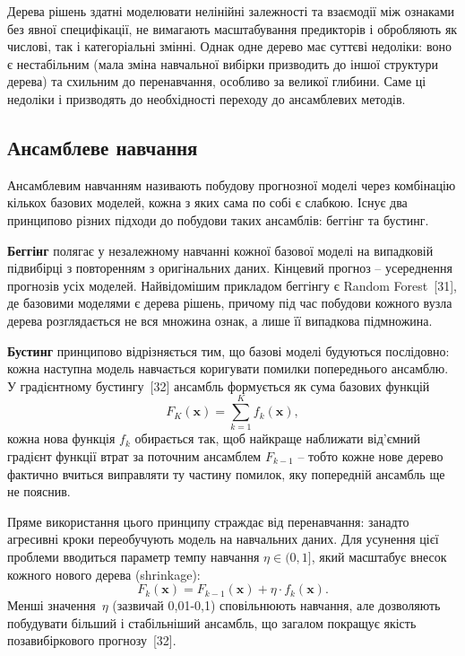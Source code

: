 \documentclass{bachelor_thesis}
\begin{document}
Дерева рішень здатні моделювати нелінійні залежності та взаємодії між ознаками без явної специфікації, не вимагають масштабування предикторів і обробляють як числові, так і категоріальні змінні. Однак одне дерево має суттєві недоліки: воно є нестабільним (мала зміна навчальної вибірки призводить до іншої структури дерева) та схильним до перенавчання, особливо за великої глибини. Саме ці недоліки і призводять до необхідності переходу до ансамблевих методів.

\subsection{Ансамблеве навчання}

Ансамблевим навчанням називають побудову прогнозної моделі через комбінацію кількох базових моделей, кожна з яких сама по собі є слабкою. Існує два принципово різних підходи до побудови таких ансамблів: беггінг та бустинг.

\textbf{Беггінг} полягає у незалежному навчанні кожної базової моделі на випадковій підвибірці з повторенням з оригінальних даних. Кінцевий прогноз -- усереднення прогнозів усіх моделей. Найвідомішим прикладом беггінгу є Random Forest~[31], де базовими моделями є дерева рішень, причому під час побудови кожного вузла дерева розглядається не вся множина ознак, а лише її випадкова підмножина.

\textbf{Бустинг} принципово відрізняється тим, що базові моделі будуються послідовно: кожна наступна модель навчається коригувати помилки попереднього ансамблю. У градієнтному бустингу~[32] ансамбль формується як сума базових функцій
\begin{equation*}
F_K(\mathbf{x}) = \sum_{k=1}^{K} f_k(\mathbf{x}),
\end{equation*}
 кожна нова функція $f_k$ обирається так, щоб найкраще наближати від'ємний градієнт функції втрат за поточним ансамблем $F_{k-1}$ -- тобто кожне нове дерево фактично вчиться виправляти ту частину помилок, яку попередній ансамбль ще не пояснив.

Пряме використання цього принципу страждає від перенавчання: занадто агресивні кроки переобучують модель на навчальних даних. Для усунення цієї проблеми вводиться параметр темпу навчання $\eta \in (0, 1]$, який масштабує внесок кожного нового дерева (shrinkage):
\begin{equation*}
F_k(\mathbf{x}) = F_{k-1}(\mathbf{x}) + \eta \cdot f_k(\mathbf{x}).
\end{equation*}
Менші значення~$\eta$ (зазвичай 0{,}01-0{,}1) сповільнюють навчання, але дозволяють побудувати більший і стабільніший ансамбль, що загалом покращує якість позавибіркового прогнозу~[32].
\end{document}
